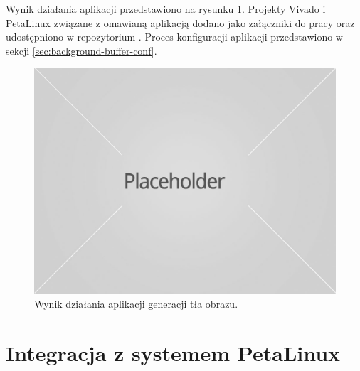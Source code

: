 Wynik działania aplikacji przedstawiono na rysunku \ref{fig:background-model-result}. Projekty Vivado i PetaLinux związane z omawianą aplikacją dodano jako załączniki do pracy oraz udostępniono w repozytorium \cite{git-repository}. Proces konfiguracji aplikacji przedstawiono w sekcji \ref{sec:background-buffer-conf}.
\begin{figure}[!htb]
	\centering
	\includegraphics[width=12cm]{img/placeholder.jpg}
	\caption{Wynik działania aplikacji generacji tła obrazu.}
	\label{fig:background-model-result}
\end{figure}

\section{Integracja z systemem PetaLinux}

